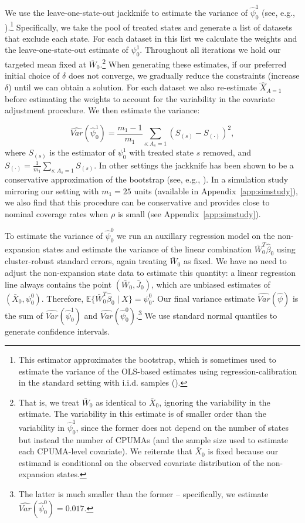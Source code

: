 \documentclass[aoas]{imsart}
\theoremstyle{plain}
\theoremstyle{remark}
\begin{document}
We use the leave-one-state-out jackknife to estimate the variance of $\hat{\psi}_0^1$ (see, e.g., \cite{cameron2015practitioner}).\footnote{This estimator approximates the bootstrap, which is sometimes used to estimate the variance of the OLS-based estimates using regression-calibration in the standard setting with i.i.d. samples (\cite{buonaccorsi2010measurement}).} Specifically, we take the pool of treated states and generate a list of datasets that exclude each state. For each dataset in this list we calculate the weights and the leave-one-state-out estimate of $\psi_0^1$. Throughout all iterations we hold our targeted mean fixed at $\bar{W}_0$.\footnote{That is, we treat $\bar{W}_0$ as identical to $\bar{X}_0$, ignoring the variability in the estimate. The variability in this estimate is of smaller order than the variability in $\hat{\psi}_0^1$, since the former does not depend on the number of states but instead the number of CPUMAs (and the sample size used to estimate each CPUMA-level covariate). We reiterate that $\bar{X}_0$ is fixed because our estimand is conditional on the observed covariate distribution of the non-expansion states.} When generating these estimates, if our preferred initial choice of $\delta$ does not converge, we gradually reduce the constraints (increase $\delta$) until we can obtain a solution. For each dataset we also re-estimate $\hat{X}_{A=1}$ before estimating the weights to account for the variability in the covariate adjustment procedure. We then estimate the variance:

\[ \hat{Var}(\hat{\psi}_0^1) = \frac{m_1 - 1}{m_1} \sum_{s:A_s = 1} \left( S_{(s)} - S_{(\cdot)} \right)^2,\]
%
where $S_{(s)}$ is the estimator of $\psi_0^1$ with treated state $s$ removed, and $S_{(\cdot)} = \frac{1}{m_1} \sum_{s:A_s=1} S_{(s)}$. In other settings the jackknife has been shown to be a conservative approximation of the bootstrap (see, e.g., \cite{efron1981jackknife}). In a simulation study mirroring our setting with $m_1 = 25$ units (available in Appendix~\ref{app:simstudy}), we also find that this procedure can be conservative and provides close to nominal coverage rates when $\rho$ is small (see Appendix~\ref{app:simstudy}).

To estimate the variance of $\hat{\psi}_0^0$ we run an auxillary regression model on the non-expansion states and estimate the variance of the linear combination $\bar{W}_0^T\hat{\beta}_0$ using cluster-robust standard errors, again treating $\bar{W}_0$ as fixed. We have no need to adjust the non-expansion state data to estimate this quantity: a linear regression line always contains the point $(\bar{W}_0, \bar{J}_0)$, which are unbiased estimates of $(\bar{X}_0, \psi_0^0)$. Therefore, $\mathbb{E}\{\bar{W}_0^T\hat{\beta}_0 \mid X\} = \psi_0^0$. Our final variance estimate $\hat{Var}(\hat{\psi})$ is the sum of $\hat{Var}(\hat{\psi}_0^1)$ and $\hat{Var}(\hat{\psi}_0^0)$.\footnote{The latter is much smaller than the former -- specifically, we estimate $\hat{Var}(\hat{\psi}_0^0) = 0.017$.} We use standard normal quantiles to generate confidence intervals.
\end{document}
